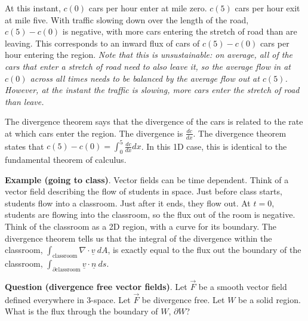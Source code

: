 \documentclass[12pt,letterpaper,noanswers]{exam}
\newcommand{\mb}[1]{\underline{#1}}
\begin{document}

At this instant, $c(0)$ cars per hour enter at mile zero.  $c(5)$ cars per hour exit at mile five.  With traffic slowing down over the length of the road, $c(5)-c(0)$ is negative, with more cars entering the stretch of road than are leaving.  This corresponds to an inward flux of cars of $c(5)-c(0)$ cars per hour entering the region.  \emph{Note that this is unsustainable: on average, all of the cars that enter a stretch of road need to also leave it, so the average flow in at $c(0)$ across all times needs to be balanced by the average flow out at $c(5)$.  However, at the instant the traffic is slowing, more cars enter the stretch of road than leave.}

The divergence theorem says that the divergence of the cars is related to the rate at which cars enter the region.  The divergence is $\frac{dc}{dx}$.  The divergence theorem states that $\displaystyle c(5) - c(0) = \int_0^5 \frac{dc}{dx}dx$.  In this 1D case, this is identical to the fundamental theorem of calculus.

\vspace{0.9in}

\noindent\textbf{Example (going to class)}.  Vector fields can be time dependent.  Think of a vector field describing the flow of students in space.  Just before class starts, students flow into a classroom.  Just after it ends, they flow out.  At $t = 0$, students are flowing into the classroom, so the flux out of the room is negative.  Think of the classroom as a 2D region, with a curve for its boundary.  The divergence theorem tells us that the integral of the divergence within the classroom, $\int_{\text{classroom}} \nabla \cdot \underline v\ dA$, is exactly equal to the flux out the boundary of the classroom, $\int_{\partial \text{classroom}} \underline v \cdot \underline n\ ds$.  

\vspace{1in}

\noindent\textbf{Question (divergence free vector fields)}.  Let $\vec F$ be a smooth vector field defined everywhere in $3$-space.  Let $\vec F$ be divergence free.  Let $W$ be a solid region.  What is the flux through the boundary of $W$, $\partial W$?

\vspace{1.5in}
\end{document}

